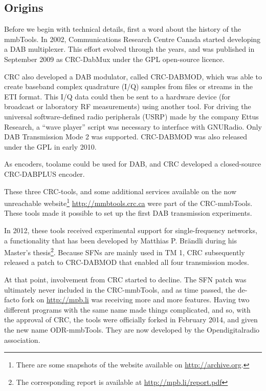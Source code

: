 \subsection{Origins}
Before we begin with technical details, first a word about the history of
the mmbTools.
In 2002, Communications Research Centre Canada
started developing a DAB multiplexer. This effort evolved through the years, and
was published in September 2009 as \mbox{CRC-DabMux} under the GPL
open-source licence.

CRC also developed a DAB modulator, called \mbox{CRC-DABMOD}, which was able to create
baseband complex quadrature (I/Q) samples from files or
streams in the ETI format. This I/Q data could then be sent to a hardware device
(for broadcast or laboratory RF measurements) using another tool. For driving
the universal software-defined radio peripherals (USRP) made by the company
Ettus Research, a ``wave player'' script was necessary to interface with GNURadio.
Only DAB Transmission Mode 2 was supported. \mbox{CRC-DABMOD} was also released
under the GPL in early 2010.

As encoders, toolame could be used for DAB, and CRC developed a closed-source
\mbox{CRC-DABPLUS} \dabplus encoder.

These three CRC-tools, and some additional services available on the now
unreachable website\footnote{There are some snapshots of the website available
    on \url{http://archive.org}.}
\url{http://mmbtools.crc.ca} were part of the \mbox{CRC-mmbTools}. These tools
made it possible to set up the first DAB transmission experiments.

In 2012, these tools received experimental support for single-frequency
networks, a functionality that has been developed by Matthias P. Brändli during
his Master's thesis\footnote{The corresponding report is available at
    \url{http://mpb.li/report.pdf}}.
Because SFNs are mainly used in TM 1, CRC subsequently released a patch to
\mbox{CRC-DABMOD} that enabled all four transmission modes.

At that point, involvement from CRC started to decline. The SFN patch was
ultimately never included in the \mbox{CRC-mmbTools}, and as time passed, the
de-facto fork on \url{http://mpb.li} was receiving more and more features.
Having two different programs with the same name made things complicated, and
so, with the approval of CRC, the tools were officially forked in February 2014,
and given the new name \mbox{ODR-mmbTools}. They are now developed by the
Opendigitalradio association.

